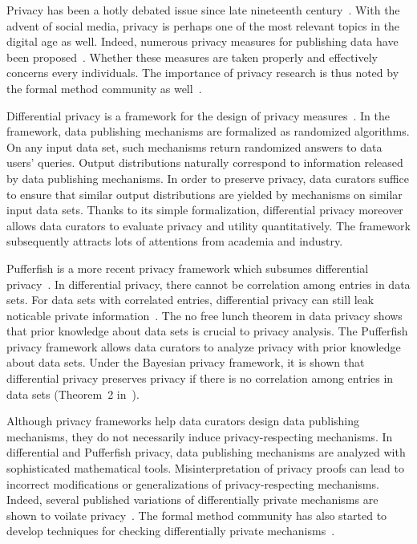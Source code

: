 

Privacy has been a hotly debated issue since late nineteenth
century~\cite{WB:90:RP}. With the advent of social media, privacy is
perhaps one of the most relevant topics in the digital age as
well. Indeed, numerous privacy measures for publishing data
have been proposed~\cite{S:2002:KAMPP,FWC:10:PPDP}. Whether these
measures are taken properly and effectively concerns every
individuals. The importance of privacy research is thus noted by the
formal method community as well~\cite{TW:09:FMP}.


Differential privacy is a framework for the design of privacy
measures~\cite{D:06:DP,DR:14:AFDP}. In the framework, data publishing
mechanisms are formalized as randomized algorithms. On any input data
set, such mechanisms return randomized answers to data users' queries.
Output distributions naturally correspond to information released by
data publishing mechanisms. In order to preserve privacy, data
curators suffice to ensure that similar output distributions are
yielded by mechanisms on similar input data sets. Thanks to its simple
formalization, differential privacy moreover allows data curators
to evaluate privacy and utility quantitatively. The framework
subsequently attracts lots of attentions from academia and industry.


Pufferfish is a more recent privacy framework which subsumes
differential privacy~\cite{KM:14:PFMPD}. In differential privacy,
there cannot be correlation among entries in data sets. For data sets
with correlated entries, differential privacy can still leak
noticable private information~\cite{KM:11:NFLDP}. The no free lunch
theorem in data privacy shows that prior knowledge about data sets is
crucial to privacy analysis. The Pufferfish privacy framework allows
data curators to analyze privacy with prior knowledge about data
sets. Under the Bayesian privacy framework, it is shown that
differential privacy preserves privacy if there is no correlation
among entries in data sets (Theorem~2 in~\cite{KM:14:PFMPD}).


Although privacy frameworks help data curators design data publishing
mechanisms, they do not necessarily induce privacy-respecting
mechanisms. In differential and Pufferfish privacy, data publishing
mechanisms are analyzed with sophisticated mathematical tools.
Misinterpretation of privacy proofs can lead to incorrect
modifications or generalizations of privacy-respecting mechanisms.
Indeed, several published variations of differentially private
mechanisms are shown to voilate privacy~\cite{DWWZK:18:DVDP}. The
formal method community has also started to develop techniques for
checking differentially private
mechanisms~\cite{TKD:11:FVDPIS,GHHNP:13:LDTDP,BDGKZ:13:VCDP}.

